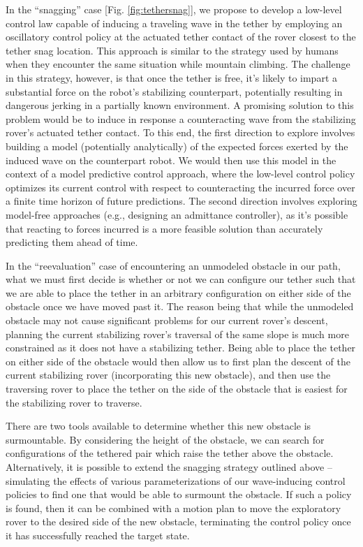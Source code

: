 \documentclass[12pt]{article}
\begin{document}

In the ``snagging'' case [Fig. \ref{fig:tethersnag}], we propose to
develop a low-level control law capable of inducing a traveling wave
in the tether by employing an oscillatory control policy at the
actuated tether contact of the rover closest to the tether snag
location. This approach is similar to the strategy used by humans when
they encounter the same situation while mountain climbing.  The
challenge in this strategy, however, is that once the tether is free,
it's likely to impart a substantial force on the robot's stabilizing
counterpart, potentially resulting in dangerous jerking in a partially
known environment.  A promising solution to this problem would be to
induce in response a counteracting wave from the stabilizing rover's
actuated tether contact. To this end, the first direction to explore
involves building a model (potentially analytically) of the expected
forces exerted by the induced wave on the counterpart robot.  We would
then use this model in the context of a model predictive control
approach, where the low-level control policy optimizes its current
control with respect to counteracting the incurred force over a finite
time horizon of future predictions. The second direction involves
exploring model-free approaches (e.g., designing an admittance
controller), as it's possible that reacting to forces incurred is a
more feasible solution than accurately predicting them ahead of time.


In the ``reevaluation'' case of encountering an unmodeled obstacle in our
path, what we must first decide is whether or not we can configure our
tether such that we are able to place the tether in an arbitrary
configuration on either side of the obstacle once we have moved past
it. The reason being that
while the unmodeled obstacle may not cause significant problems for
our current rover's descent, planning the current stabilizing rover's
traversal of the same slope is much more constrained as it does not
have a stabilizing tether. Being able to place the tether on either
side of the obstacle would then allow us to first plan the descent of
the current stabilizing rover (incorporating this new obstacle), and
then use the traversing rover to place the tether on the side of the
obstacle that is easiest for the stabilizing rover to traverse.

There are two tools available to determine whether this new obstacle
is surmountable. By considering the height of the obstacle, we can
search for configurations of the tethered pair which raise the tether
above the obstacle.  Alternatively, it is possible to extend the
snagging strategy outlined above -- simulating the effects of various
parameterizations of our wave-inducing control policies to find one
that would be able to surmount the obstacle. If such a policy is
found, then it can be combined with a motion plan to move the
exploratory rover to the desired side of the new obstacle, terminating
the control policy once it has successfully reached the target state.
\end{document}
